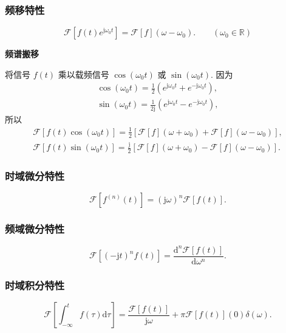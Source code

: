 \subsubsection{频移特性}
\rmg
\begin{equation} \label{eq:3.6 freq move}
    \mathcal{F}[f(t)e^{\mathrm{j}\omega_0 t}]=\mathcal{F}[f](\omega-\omega_0).\qquad (\omega_0\in\mathbb{R})
\end{equation}

\textbf{频谱搬移}

将信号 $f(t)$ 乘以载频信号 $\cos(\omega_0 t)$ 或 $\sin(\omega_0 t)$. 因为
\begin{gather*}
    \cos(\omega_0 t)=\frac{1}{2}(e^{\mathrm{j}\omega_0 t}+e^{-\mathrm{j}\omega_0 t}), \\
    \sin(\omega_0 t)=\frac{1}{2\mathrm{j}}(e^{\mathrm{j}\omega_0 t}-e^{-\mathrm{j}\omega_0 t}),
\end{gather*}
所以
\begin{gather}
    \mathcal{F}[f(t)\cos(\omega_0 t)]=\frac{1}{2}[\mathcal{F}[f](\omega+\omega_0)+\mathcal{F}[f](\omega-\omega_0)], \label{eq:3.6 freq move cos} \\
    \mathcal{F}[f(t)\sin(\omega_0 t)]=\frac{\mathrm{j}}{2}[\mathcal{F}[f](\omega+\omega_0)-\mathcal{F}[f](\omega-\omega_0)]. \label{eq:3.6 freq move sin}
\end{gather}

\subsubsection{时域微分特性}
\rmg
\begin{equation}
    \mathcal{F}[f^{(n)}(t)]=(\mathrm{j}\omega)^n\mathcal{F}[f(t)].
\end{equation}

\subsubsection{频域微分特性}
\rmg
\begin{equation}
    \mathcal{F}[(-\mathrm{j}t)^nf(t)]=\frac{\mathrm{d}^n\mathcal{F}[f(t)]}{\mathrm{d}\omega^n}.
\end{equation}

\subsubsection{时域积分特性}
\rmg
\begin{equation}
    \mathcal{F}\left[\int_{-\infty}^{t}f(\tau)\mathrm{d}\tau\right]=\frac{\mathcal{F}[f(t)]}{\mathrm{j}\omega}+\pi\mathcal{F}[f(t)](0)\delta(\omega).
\end{equation}
